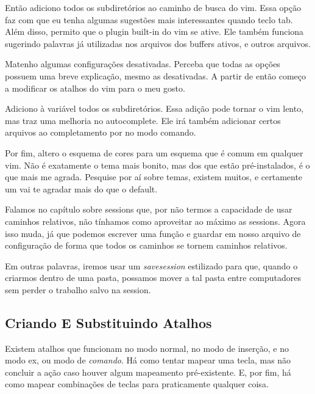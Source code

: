 Então adiciono todos os subdiretórios ao caminho de busca do vim.
Essa opção faz com que eu tenha algumas sugestões mais interessantes quando teclo tab.
Além disso, permito que o plugin built-in do vim se ative.
Ele também funciona sugerindo palavras já utilizadas nos arquivos dos buffers ativos, e outros arquivos.

Matenho algumas configurações desativadas.
Perceba que todas as opções possuem uma breve explicação, mesmo as desativadas.
A partir de então começo a modificar os atalhos do vim para o meu gosto.

Adiciono à variável  todos os subdiretórios.
Essa adição pode tornar o vim lento, mas traz uma melhoria no autocomplete.
Ele irá também adicionar certos arquivos ao completamento por  no modo comando.

Por fim, altero o esquema de cores para um esquema que é comum em qualquer vim.
Não é exatamente o tema mais bonito, mas dos que estão pré-instalados, é o que mais me agrada.
Pesquise por aí sobre temas, existem muitos, e certamente um vai te agradar mais do que o default.


Falamos no capítulo sobre sessions que, por não termos a capacidade de usar caminhos relativos,
não tínhamos como aproveitar ao máximo as sessions.
Agora isso muda, já que podemos escrever uma função e guardar em
nosso arquivo de configuração de forma que todos os caminhos se tornem
caminhos relativos.

Em outras palavras, iremos usar um \emph{savesession} estilizado para que,
quando o criarmos dentro de uma pasta, possamos mover a tal pasta entre
computadores sem perder o trabalho salvo na session.


\subsection{Criando E Substituindo Atalhos}
Existem atalhos que funcionam no modo normal, no modo de inserção, e no modo ex, ou modo de \emph{comando}.
Há como tentar mapear uma tecla, mas não concluir a ação caso houver algum mapeamento pré-existente.
E, por fim, há como mapear combinações de teclas para praticamente qualquer coisa.

